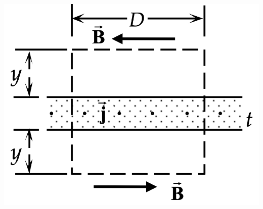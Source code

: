 \begin{description}[labelwidth=1.5cm, leftmargin=!]
\begin{minipage}{0.27\textwidth}
            \includegraphics[scale = 0.275]{oz03/resources/Oz3Oef2Tekening.png}
        \end{minipage}

\end{description}

\vspace{1cm}